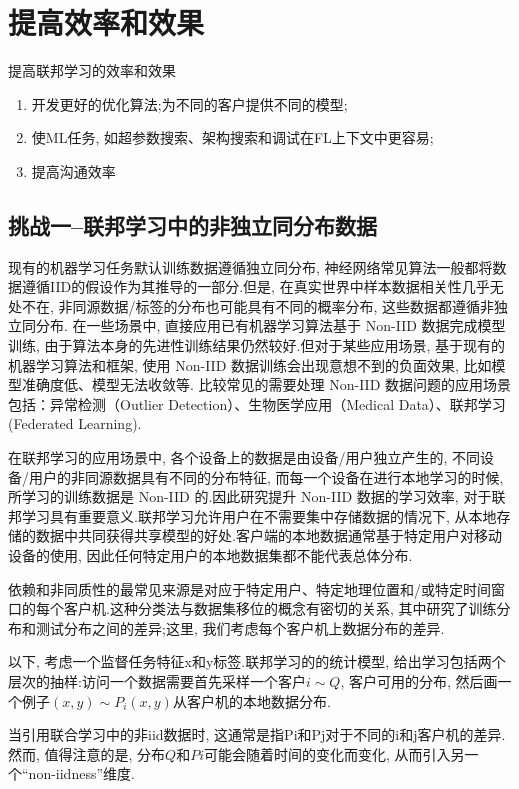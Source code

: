 
\section{提高效率和效果}

提高联邦学习的效率和效果
\begin{enumerate}
    \item 开发更好的优化算法;为不同的客户提供不同的模型;
    \item 使ML任务, 如超参数搜索、架构搜索和调试在FL上下文中更容易;
    \item 提高沟通效率
\end{enumerate}

\subsection{挑战一--联邦学习中的非独立同分布数据}
现有的机器学习任务默认训练数据遵循独立同分布, 神经网络常见算法一般都将数据遵循IID的假设作为其推导的一部分.但是, 在真实世界中样本数据相关性几乎无处不在, 非同源数据/标签的分布也可能具有不同的概率分布, 这些数据都遵循非独立同分布.
在一些场景中, 直接应用已有机器学习算法基于 Non-IID 数据完成模型训练, 由于算法本身的先进性训练结果仍然较好.但对于某些应用场景, 基于现有的机器学习算法和框架, 使用 Non-IID 数据训练会出现意想不到的负面效果, 比如模型准确度低、模型无法收敛等.
比较常见的需要处理 Non-IID 数据问题的应用场景包括：异常检测（Outlier Detection）、生物医学应用（Medical Data）、联邦学习 (Federated Learning).

在联邦学习的应用场景中, 各个设备上的数据是由设备/用户独立产生的, 不同设备/用户的非同源数据具有不同的分布特征, 而每一个设备在进行本地学习的时候, 所学习的训练数据是 Non-IID 的.因此研究提升 Non-IID 数据的学习效率, 对于联邦学习具有重要意义.联邦学习允许用户在不需要集中存储数据的情况下, 从本地存储的数据中共同获得共享模型的好处.客户端的本地数据通常基于特定用户对移动设备的使用, 因此任何特定用户的本地数据集都不能代表总体分布.


依赖和非同质性的最常见来源是对应于特定用户、特定地理位置和/或特定时间窗口的每个客户机.这种分类法与数据集移位的概念有密切的关系,  其中研究了训练分布和测试分布之间的差异;这里, 我们考虑每个客户机上数据分布的差异.

以下, 考虑一个监督任务特征x和y标签.联邦学习的的统计模型, 给出学习包括两个层次的抽样:访问一个数据需要首先采样一个客户$i\sim Q$, 客户可用的分布, 然后画一个例子$(x,  y) \sim P_i(x,  y)$从客户机的本地数据分布.

当引用联合学习中的非iid数据时, 这通常是指Pi和Pj对于不同的i和j客户机的差异.然而, 值得注意的是, 分布$Q$和$Pi$可能会随着时间的变化而变化, 从而引入另一个“non-iidness”维度.

